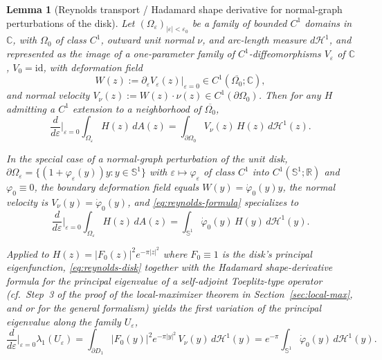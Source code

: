 \documentclass[a4paper,11pt,reqno]{amsart}
\numberwithin{equation}{section}
\theoremstyle{plain} %
\newtheorem{lemma}{Lemma}[section]
\theoremstyle{definition} %
\theoremstyle{remark}
\newcommand{\R}{\mathbb{R}}
\newcommand{\C}{\mathbb{C}}
\begin{document}
\begin{lemma}[Reynolds transport / Hadamard shape derivative for normal-graph
perturbations of the disk]\label{lem:hadamard-shape-derivative}
Let \((\Omega_\varepsilon)_{|\varepsilon|<\varepsilon_0}\) be a family of
bounded \(C^1\) domains in \(\C\), with \(\Omega_0\) of class \(C^1\),
outward unit normal \(\nu\), and arc-length measure \(d\mathcal H^1\), and
represented as the image of a one-parameter family of \(C^1\)-diffeomorphisms
\(V_\varepsilon\) of \(\C\), \(V_0=\mathrm{id}\), with deformation field
\[
W(z):=\partial_\varepsilon V_\varepsilon(z)\bigl|_{\varepsilon=0}
\in C^1(\overline{\Omega_0};\C),
\]
and normal velocity \(V_\nu(z):=W(z)\cdot\nu(z)\in C^1(\partial\Omega_0)\).
Then for any \(H\) admitting a \(C^1\) extension to a neighborhood of
\(\overline{\Omega_0}\),
\begin{equation}\label{eq:reynolds-formula}
\frac{d}{d\varepsilon}\Big|_{\varepsilon=0}
\int_{\Omega_\varepsilon} H(z)\,dA(z)
=
\int_{\partial\Omega_0}V_\nu(z)\,H(z)\,d\mathcal H^1(z).
\end{equation}

In the special case of a normal-graph perturbation of the unit disk,
\(\partial\Omega_\varepsilon=\{(1+\varphi_\varepsilon(y))y:y\in\mathbb S^1\}\)
with \(\varepsilon\mapsto \varphi_\varepsilon\) of class \(C^1\) into
\(C^1(\mathbb S^1;\R)\) and \(\varphi_0\equiv 0\), the boundary deformation
field equals \(W(y)=\dot\varphi_0(y)y\), the normal velocity is
\(V_\nu(y)=\dot\varphi_0(y)\), and \eqref{eq:reynolds-formula} specializes to
\begin{equation}\label{eq:reynolds-disk}
\frac{d}{d\varepsilon}\Big|_{\varepsilon=0}
\int_{\Omega_\varepsilon} H(z)\,dA(z)
=
\int_{\mathbb S^1}\dot\varphi_0(y)\,H(y)\,d\mathcal H^1(y).
\end{equation}

Applied to \(H(z)=|F_0(z)|^2 e^{-\pi|z|^2}\) where \(F_0\equiv 1\) is the
disk's principal eigenfunction, \eqref{eq:reynolds-disk} together with the
Hadamard shape-derivative formula for the principal eigenvalue of a
self-adjoint Toeplitz-type operator (cf.\ Step~3 of the proof of the
local-maximizer theorem in Section~\ref{sec:local-max}, and
\cite[Thm.~5.7.1]{Henrot-Pierre} or \cite{Sokolowski-Zolesio} for the general
formalism) yields the first variation of the principal eigenvalue along the
family \(U_\varepsilon\),
\begin{equation}\label{eq:hadamard-eigenvalue}
\frac{d}{d\varepsilon}\Big|_{\varepsilon=0}\lambda_1(U_\varepsilon)
=
\int_{\partial D_1}|F_0(y)|^2 e^{-\pi|y|^2}\,V_\nu(y)\,d\mathcal H^1(y)
=
e^{-\pi}\int_{\mathbb S^1}\dot\varphi_0(y)\,d\mathcal H^1(y).
\end{equation}
\end{lemma}
\end{document}
